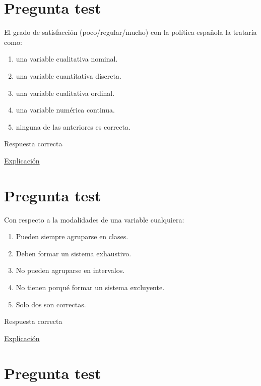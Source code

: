 \documentclass[
]{book}
\providecommand{\tightlist}{%
  \setlength{\itemsep}{0pt}\setlength{\parskip}{0pt}}
\begin{document}
\hypertarget{pregunta-test-23}{%
\section{Pregunta test}\label{pregunta-test-23}}

El grado de satisfacción (poco/regular/mucho) con la política española la trataría como:

\begin{enumerate}
\def\labelenumi{\alph{enumi})}
\tightlist
\item
  una variable cualitativa nominal.
\item
  una variable cuantitativa discreta.
\item
  una variable cualitativa ordinal.
\item
  una variable numérica continua.
\item
  ninguna de las anteriores es correcta.
\end{enumerate}

Respuesta correcta

\href{https://1fjmanzano.github.io/bioestadistica/tipos-de-variables.html}{Explicación}

\hypertarget{pregunta-test-24}{%
\section{Pregunta test}\label{pregunta-test-24}}

Con respecto a la modalidades de una variable cualquiera:

\begin{enumerate}
\def\labelenumi{\alph{enumi})}
\tightlist
\item
  Pueden siempre agruparse en clases.
\item
  Deben formar un sistema exhaustivo.
\item
  No pueden agruparse en intervalos.
\item
  No tienen porqué formar un sistema excluyente.
\item
  Solo dos son correctas.
\end{enumerate}

Respuesta correcta

\href{https://1fjmanzano.github.io/bioestadistica/tipos-de-variables.html}{Explicación}

\hypertarget{pregunta-test-25}{%
\section{Pregunta test}\label{pregunta-test-25}}
\end{document}

